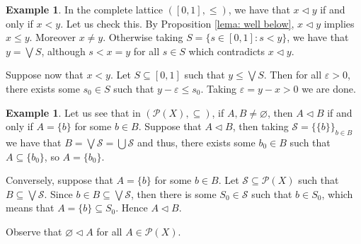 \documentclass[11pt,a4paper]{amsart}
\newtheorem{lemma}[theorem]{Lemma}
\theoremstyle{definition}
\newtheorem{example}[theorem]{Example}
\begin{document}
	
	\begin{example}\label{ex: 01}
		In the complete lattice $([0,1],\leq)$, we have that $x\lhd y$ if and only if $x<y$. Let us check this. By Proposition \ref{lema: well below}, $x\lhd y$ implies $x\leq y$. Moreover $x\neq y$. Otherwise taking $S=\{s\in[0,1]: s<y\}$, we have that $y=\bigvee S$, although $s<x=y$ for all $s\in S$ which contradicts $x\lhd y$.
		
		\noindent Suppose now that $x<y$. Let $S\subseteq [0,1]$ such that $y\leq\bigvee S$. Then for all $\varepsilon>0$, there exists some $s_0\in S$ such that $y-\varepsilon\leq s_0$. Taking $\varepsilon=y-x>0$ we are done.
	\end{example}
	
	\begin{example}\label{ex: P(X)}
		Let us see that in $(\mathcal{P}(X),\subseteq)$, if $A,B\neq\varnothing$, then $A\lhd B$ if and only if  $A=\{b\}$ for some $b\in B$. Suppose that $A\lhd B$, then taking $\mathcal{S}=\{\{b\}\}_{b\in B}$ we have that $B=\bigvee \mathcal{S}=\bigcup \mathcal{S}$ and thus, there exists some $b_0\in B$ such that $A\subseteq \{b_0\}$, so $A=\{b_0\}$. 
		
		Conversely, suppose that $A=\{b\}$ for some $b\in B$. Let $\mathcal{S}\subseteq \mathcal{P}(X)$ such that $B\subseteq \bigvee\mathcal S$. Since $b\in B\subseteq \bigvee \mathcal S$, then there is some $S_0\in \mathcal S$ such that $b\in S_0$, which means that $A=\{b\}\subseteq S_0$. Hence $A\lhd B.$
		
		Observe that $\varnothing\lhd A$ for all $A\in\mathcal{P}(X).$
	\end{example}
	
	
	
	
		
	
\end{document}
